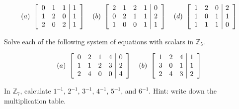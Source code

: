 \begin{enumialphparenastyle}
\begin{ex}
  \begin{equation*}
    (a)~
    \left[
    \begin{array}{rrr|r}
      0 & 1 & 1 & 1 \\
      1 & 2 & 0 & 1 \\
      2 & 0 & 2 & 1
    \end{array}
    \right]
    \quad
    (b)~
    \left[
    \begin{array}{rrrr|r}
      2 & 1 & 2 & 1 & 0 \\
      0 & 2 & 1 & 1 & 2 \\
      1 & 0 & 0 & 1 & 1
    \end{array}
    \right]
    \quad
    (d)~
    \left[
    \begin{array}{rrr|r}
      1 & 2 & 0 & 2 \\
      1 & 0 & 1 & 1 \\
      1 & 1 & 1 & 0
    \end{array}
    \right]
  \end{equation*}
\end{ex}

\begin{ex}
  Solve each of the following system of equations with scalars in
  $\mathbb{Z}_5$. 

  \begin{equation*}
    (a)~
    \left[
    \begin{array}{rrrr|r}
      0 & 2 & 1 & 4 & 0 \\
      1 & 1 & 2 & 3 & 2 \\
      2 & 4 & 0 & 0 & 4
    \end{array}
    \right]
    \quad
    (b)~
    \left[
    \begin{array}{rrr|r}
      1 & 2 & 4 & 1 \\
      3 & 0 & 1 & 1 \\
      2 & 4 & 3 & 2
    \end{array}
    \right]
  \end{equation*}
\end{ex}

\begin{ex}
  In $\mathbb{Z}_7$, calculate $1^{-1}$, $2^{-1}$, $3^{-1}$, $4^{-1}$,
  $5^{-1}$, and $6^{-1}$. Hint: write down the multiplication table.
\end{ex}


\end{enumialphparenastyle}
